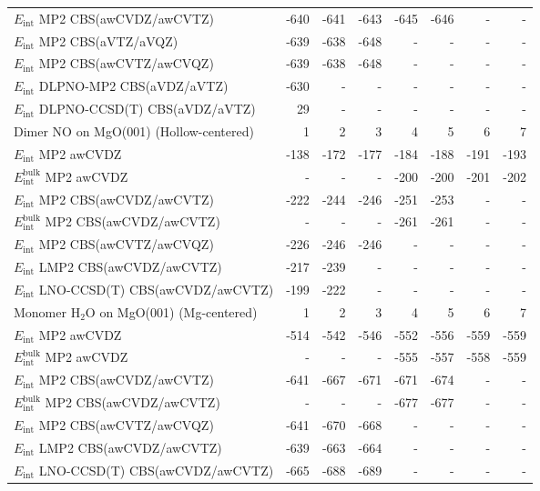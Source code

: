 \begin{longtable}{lrrrrrrr}
$E_\textrm{int}$ MP2 CBS(awCVDZ/awCVTZ) & -640 & -641 & -643 & -645 & -646 & - & - \\
$E_\textrm{int}$ MP2 CBS(aVTZ/aVQZ) & -639 & -638 & -648 & - & - & - & - \\
$E_\textrm{int}$ MP2 CBS(awCVTZ/awCVQZ) & -639 & -638 & -648 & - & - & - & - \\
$E_\textrm{int}$ DLPNO-MP2 CBS(aVDZ/aVTZ) & -630 & - & - & - & - & - & - \\
$E_\textrm{int}$ DLPNO-CCSD(T) CBS(aVDZ/aVTZ) & 29 & - & - & - & - & - & - \\
\toprule
Dimer NO on MgO(001) (Hollow-centered) & 1 & 2 & 3 & 4 & 5 & 6 & 7 \\ 
\midrule
$E_\textrm{int}$ MP2 awCVDZ & -138 & -172 & -177 & -184 & -188 & -191 & -193 \\
$E_\textrm{int}^\textrm{bulk}$ MP2 awCVDZ & - & - & - & -200 & -200 & -201 & -202 \\
$E_\textrm{int}$ MP2 CBS(awCVDZ/awCVTZ) & -222 & -244 & -246 & -251 & -253 & - & - \\
$E_\textrm{int}^\textrm{bulk}$ MP2 CBS(awCVDZ/awCVTZ) & - & - & - & -261 & -261 & - & - \\
$E_\textrm{int}$ MP2 CBS(awCVTZ/awCVQZ) & -226 & -246 & -246 & - & - & - & - \\
$E_\textrm{int}$ LMP2 CBS(awCVDZ/awCVTZ) & -217 & -239 & - & - & - & - & - \\
$E_\textrm{int}$ LNO-CCSD(T) CBS(awCVDZ/awCVTZ) & -199 & -222 & - & - & - & - & - \\
\toprule
Monomer H$_2$O on MgO(001) (Mg-centered) & 1 & 2 & 3 & 4 & 5 & 6 & 7 \\ 
\midrule
$E_\textrm{int}$ MP2 awCVDZ & -514 & -542 & -546 & -552 & -556 & -559 & -559 \\
$E_\textrm{int}^\textrm{bulk}$ MP2 awCVDZ & - & - & - & -555 & -557 & -558 & -559 \\
$E_\textrm{int}$ MP2 CBS(awCVDZ/awCVTZ) & -641 & -667 & -671 & -671 & -674 & - & - \\
$E_\textrm{int}^\textrm{bulk}$ MP2 CBS(awCVDZ/awCVTZ) & - & - & - & -677 & -677 & - & - \\
$E_\textrm{int}$ MP2 CBS(awCVTZ/awCVQZ) & -641 & -670 & -668 & - & - & - & - \\
$E_\textrm{int}$ LMP2 CBS(awCVDZ/awCVTZ) & -639 & -663 & -664 & - & - & - & - \\
$E_\textrm{int}$ LNO-CCSD(T) CBS(awCVDZ/awCVTZ) & -665 & -688 & -689 & - & - & - & - \\
\toprule

\end{longtable}
